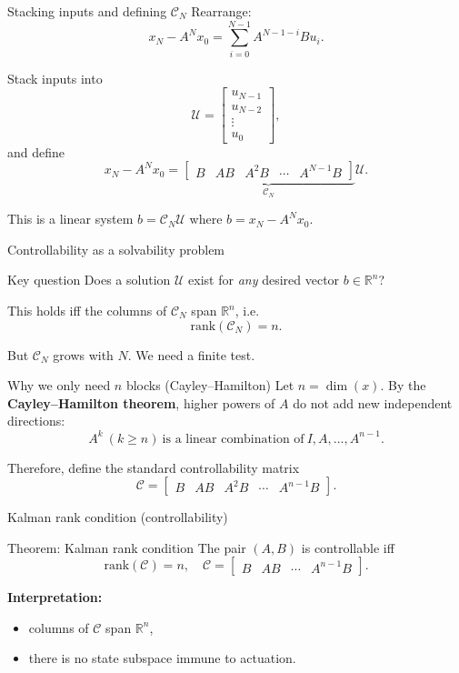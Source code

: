 \documentclass[aspectratio=169,10pt]{beamer}
\newcommand{\R}{\mathbb{R}}
\newcommand{\Ccal}{\mathcal{C}}
\begin{document}
\begin{frame}{Stacking inputs and defining \(\mathcal{C}_N\)}
Rearrange:
\[
x_N - A^N x_0 = \sum_{i=0}^{N-1} A^{N-1-i}B u_i.
\]

Stack inputs into
\[
\mathcal{U}=
\begin{bmatrix}
u_{N-1}\\u_{N-2}\\\vdots\\u_0
\end{bmatrix},
\]
and define
\[
x_N - A^N x_0 =
\underbrace{\begin{bmatrix}
B & AB & A^2B & \cdots & A^{N-1}B
\end{bmatrix}}_{\mathcal{C}_N}
\mathcal{U}.
\]

This is a linear system \(b=\mathcal{C}_N\mathcal{U}\) where \(b=x_N-A^N x_0\).
\end{frame}

\begin{frame}{Controllability as a solvability problem}
\begin{alertbox}{Key question}
Does a solution \(\mathcal{U}\) exist for \emph{any} desired vector \(b\in\R^n\)?
\end{alertbox}

This holds iff the columns of \(\mathcal{C}_N\) span \(\R^n\), i.e.
\[
\mathrm{rank}(\mathcal{C}_N)=n.
\]

But \(\mathcal{C}_N\) grows with \(N\). We need a finite test.
\end{frame}

\begin{frame}{Why we only need \(n\) blocks (Cayley--Hamilton)}
Let \(n=\dim(x)\).
By the \textbf{Cayley--Hamilton theorem}, higher powers of \(A\) do not add new independent directions:
\[
A^k\ (k\ge n)\ \text{is a linear combination of}\ I,A,\dots,A^{n-1}.
\]

Therefore, define the standard controllability matrix
\[
\Ccal=\begin{bmatrix}
B & AB & A^2B & \cdots & A^{n-1}B
\end{bmatrix}.
\]
\end{frame}

\begin{frame}{Kalman rank condition (controllability)}
\begin{alertbox}{Theorem: Kalman rank condition}
The pair \((A,B)\) is controllable iff
\[
\mathrm{rank}(\Ccal)=n,
\quad
\Ccal=\begin{bmatrix}B & AB & \cdots & A^{n-1}B\end{bmatrix}.
\]
\end{alertbox}

\textbf{Interpretation:}
\begin{itemize}
  \item columns of \(\Ccal\) span \(\R^n\),
  \item there is no state subspace immune to actuation.
\end{itemize}
\end{frame}
\end{document}

